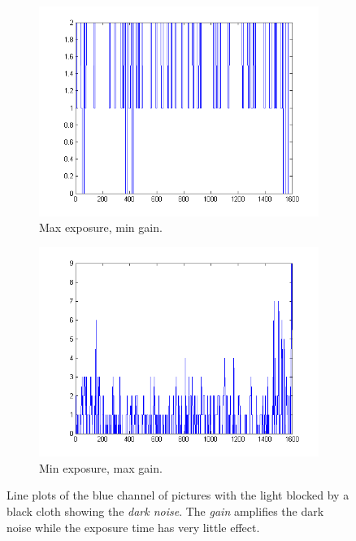 \documentclass[a4paper, 12pt]{paper}
\begin{document}
\begin{figure}[H]
\begin{subfigure}[b]{0.45\textwidth}
        \includegraphics[width=\textwidth]{img/plot_black_c}
        \caption{Max exposure, min gain.}
    \end{subfigure}
    \begin{subfigure}[b]{0.45\textwidth}
        \includegraphics[width=\textwidth]{img/plot_black_d}
        \caption{Min exposure, max gain.}
    \end{subfigure}
    \caption{Line plots of the blue channel of pictures with the light blocked by a black cloth showing the \emph{dark noise}. The \emph{gain} amplifies the dark noise while the exposure time has very little effect.}
\label{fig:black}
\end{figure}
\end{document}
